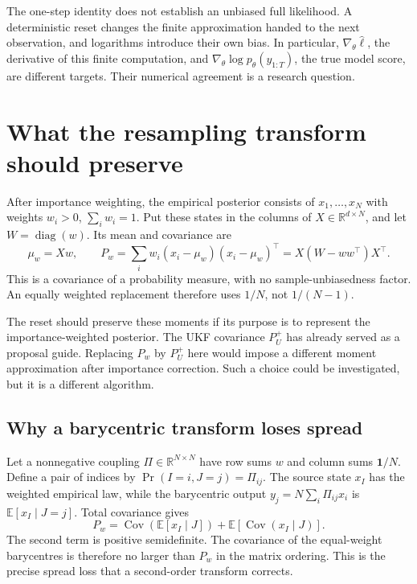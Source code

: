 \documentclass[11pt,a4paper]{article}
\newcommand{\R}{\mathbb R}
\newcommand{\E}{\mathbb E}
\newcommand{\Cov}{\operatorname{Cov}}
\newcommand{\diag}{\operatorname{diag}}
\newcommand{\one}{\mathbf 1}
\begin{document}
The one-step identity does not establish an unbiased full likelihood.
A deterministic reset changes the finite approximation handed to the
next observation, and logarithms introduce their own bias. In particular,
\(\nabla_\theta\widehat\ell\), the derivative of this finite computation,
and \(\nabla_\theta\log p_\theta(y_{1:T})\), the true model score, are
different targets. Their numerical agreement is a research question.


\section{What the resampling transform should preserve}

After importance weighting, the empirical posterior consists of
\(x_1,\ldots,x_N\) with weights \(w_i>0\), \(\sum_iw_i=1\). Put these states
in the columns of \(X\in\R^{d\times N}\), and let \(W=\diag(w)\). Its mean
and covariance are
\begin{equation}
\label{eq:weighted-moments}
 \mu_w=Xw,\qquad
 P_w=\sum_iw_i(x_i-\mu_w)(x_i-\mu_w)^\top
     =X(W-ww^\top)X^\top .
\end{equation}
This is a covariance of a probability measure, with no sample-unbiasedness
factor. An equally weighted replacement therefore uses \(1/N\), not
\(1/(N-1)\).

The reset should preserve these moments if its purpose is to represent
the importance-weighted posterior. The UKF covariance \(P_U^+\) has already
served as a proposal guide. Replacing \(P_w\) by \(P_U^+\) here would impose
a different moment approximation after importance correction. Such a
choice could be investigated, but it is a different algorithm.

\subsection{Why a barycentric transform loses spread}

Let a nonnegative coupling \(\Pi\in\R^{N\times N}\) have row sums \(w\)
and column sums \(\one/N\). Define a pair of indices by
\(\Pr(I=i,J=j)=\Pi_{ij}\). The source state \(x_I\) has the weighted
empirical law, while the barycentric output
\(y_j=N\sum_i\Pi_{ij}x_i\) is \(\E[x_I\mid J=j]\). Total covariance gives
\begin{equation}
\label{eq:barycentric-loss}
 P_w
 =\Cov\!\left(\E[x_I\mid J]\right)
  +\E\!\left[\Cov(x_I\mid J)\right].
\end{equation}
The second term is positive semidefinite. The covariance of the equal-weight
barycentres is therefore no larger than \(P_w\) in the matrix ordering.
This is the precise spread loss that a second-order transform corrects.
\end{document}
